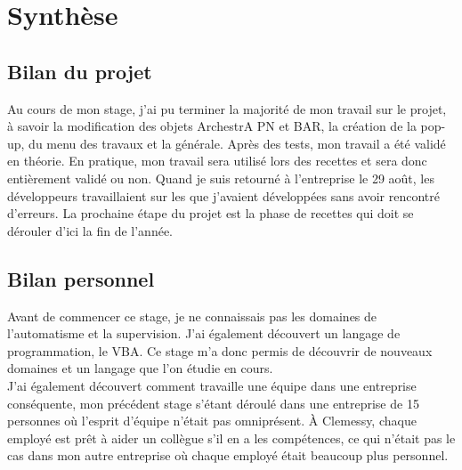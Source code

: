 \section{Synthèse}
\subsection{Bilan du projet}
Au cours de mon stage, j'ai pu terminer la majorité de mon travail sur le projet, à savoir la modification des objets ArchestrA PN et BAR, la création de la pop-up, du menu des travaux et la  générale. Après des tests, mon travail a été validé en théorie. En pratique, mon travail sera utilisé lors des recettes et sera donc entièrement validé ou non. Quand je suis retourné à l'entreprise le 29 août, les développeurs travaillaient sur les que j'avaient développées sans avoir rencontré d'erreurs. La prochaine étape du projet est la phase de recettes qui doit se dérouler d'ici la fin de l'année.
\subsection{Bilan personnel}
Avant de commencer ce stage, je ne connaissais pas les domaines de l'automatisme et la supervision. J'ai également découvert un langage de programmation, le VBA. Ce stage m'a donc permis de découvrir de nouveaux domaines et un langage que l'on étudie en cours.\\J'ai également découvert comment travaille une équipe dans une entreprise conséquente, mon précédent stage s'étant déroulé dans une entreprise de 15 personnes où l'esprit d'équipe n'était pas omniprésent. À Clemessy, chaque employé est prêt à aider un collègue s'il en a les compétences, ce qui n'était pas le cas dans mon autre entreprise où chaque employé était beaucoup plus personnel.